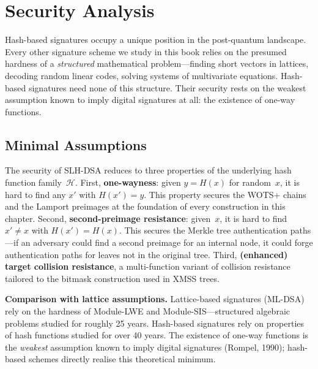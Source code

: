 \section{Security Analysis}
\label{sec:hash-security}

Hash-based signatures occupy a unique position in the post-quantum landscape.  Every other signature scheme we study in this book relies on the presumed hardness of a \emph{structured} mathematical problem---finding short vectors in lattices, decoding random linear codes, solving systems of multivariate equations.  Hash-based signatures need none of this structure.  Their security rests on the weakest assumption known to imply digital signatures at all: the existence of one-way functions.

\subsection{Minimal Assumptions}
\label{subsec:minimal-assumptions}

The security of SLH-DSA reduces to three properties of the underlying hash function family~$\mathcal{H}$.  First, \textbf{one-wayness}: given $y = H(x)$ for random~$x$, it is hard to find any $x'$ with $H(x') = y$.  This property secures the WOTS+ chains and the Lamport preimages at the foundation of every construction in this chapter.  Second, \textbf{second-preimage resistance}: given~$x$, it is hard to find $x' \neq x$ with $H(x') = H(x)$.  This secures the Merkle tree authentication paths---if an adversary could find a second preimage for an internal node, it could forge authentication paths for leaves not in the original tree.  Third, \textbf{(enhanced) target collision resistance}, a multi-function variant of collision resistance tailored to the bitmask construction used in XMSS trees.

\begin{svgraybox}
\textbf{Comparison with lattice assumptions.}  Lattice-based signatures (ML-DSA) rely on the hardness of Module-LWE and Module-SIS---structured algebraic problems studied for roughly 25 years.  Hash-based signatures rely on properties of hash functions studied for over 40 years.  The existence of one-way functions is the \emph{weakest} assumption known to imply digital signatures (Rompel, 1990); hash-based schemes directly realise this theoretical minimum.
\end{svgraybox}

